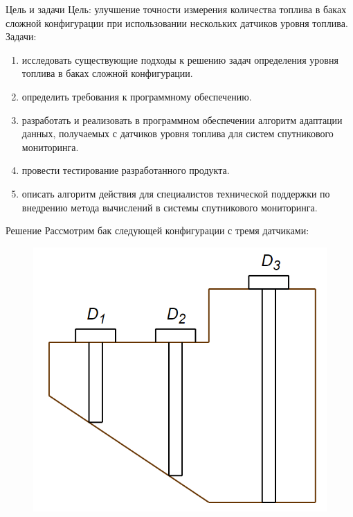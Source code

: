 \documentclass[usenames,dvipsnames,11pt]{beamer}
\begin{document}
\begin{frame}{Цель и задачи}
	Цель: улучшение точности измерения количества топлива в баках сложной конфигурации при использовании нескольких датчиков уровня топлива.
	\bigbreak 
	Задачи:
	\begin{enumerate}
		\item исследовать существующие подходы к решению задач определения уровня топлива в баках сложной конфигурации.
		\item определить требования к программному обеспечению.
		\item разработать и реализовать в программном обеспечении алгоритм адаптации данных, получаемых с датчиков уровня топлива для систем спутникового мониторинга.
		\item провести тестирование разработанного продукта.
		\item описать алгоритм действия для специалистов технической поддержки по внедрению метода вычислений в системы спутникового мониторинга.			
	\end{enumerate}
\end{frame}	

\begin{frame}{Решение}
	Рассмотрим бак следующей конфигурации с тремя датчиками:
	\begin{figure}
		\centering
		\includegraphics[width=0.6\linewidth]{graphics/screenshot005}
	\end{figure}
\end{frame}	
\end{document}
